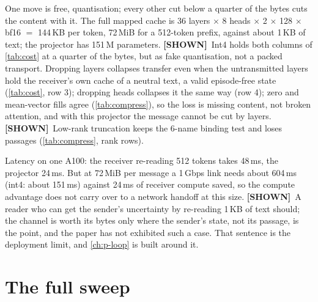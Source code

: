 \documentclass[11pt,a4paper]{report}
\newcommand{\SHOWN}{\textcolor{shownc}{\textbf{\scriptsize[SHOWN]}}}
\begin{document}
One move is free, quantisation; every other cut below a quarter of the bytes cuts the content with it. The full mapped cache is 36 layers $\times$ 8 heads $\times$ 2 $\times$ 128 $\times$ bf16 $=$ 144\,KB per token, 72\,MiB for a 512-token prefix, against about 1\,KB of text; the projector has 151\,M parameters. \SHOWN\ Int4 holds both columns of \cref{tab:cost} at a quarter of the bytes, but as fake quantisation, not a packed transport. Dropping layers collapses transfer even when the untransmitted layers hold the receiver's own cache of a neutral text, a valid episode-free state (\cref{tab:cost}, row 3); dropping heads collapses it the same way (row 4); zero and mean-vector fills agree (\cref{tab:compress}), so the loss is missing content, not broken attention, and with this projector the message cannot be cut by layers. \SHOWN\ Low-rank truncation keeps the 6-name binding test and loses passages (\cref{tab:compress}, rank rows).

Latency on one A100: the receiver re-reading 512 tokens takes 48\,ms, the projector 24\,ms. But at 72\,MiB per message a 1\,Gbps link needs about 604\,ms (int4: about 151\,ms) against 24\,ms of receiver compute saved, so the compute advantage does not carry over to a network handoff at this size. \SHOWN\ A reader who can get the sender's uncertainty by re-reading 1\,KB of text should; the channel is worth its bytes only where the sender's state, not its passage, is the point, and the paper has not exhibited such a case. That sentence is the deployment limit, and \cref{ch:p-loop} is built around it.

\section{The full sweep}
\end{document}
